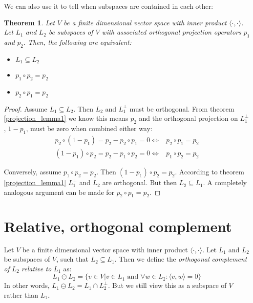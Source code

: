 \documentclass[12pt, a4paper]{article}
\newtheorem{theorem}{Theorem}[section]
\numberwithin{equation}{section}
\begin{document}
We can also use it to tell when subspaces are contained in each other:

\begin{theorem}
\label{projection_lemma2}
Let $V$ be a finite dimensional vector space with inner product $\langle\cdot,\cdot\rangle$. Let $L_1$ and $L_2$ be subspaces of $V$ with associated orthogonal projection operators $p_1$ and $p_2$. Then, the following are equivalent:
\begin{itemize}
\item $L_1\subseteq L_2$
\item $p_1\circ p_2=p_2$
\item $p_2\circ p_1=p_2$
\end{itemize}
\end{theorem}
\begin{proof}
Assume $L_1\subseteq L_2$. Then $L_2$ and $L_1^\perp$ must be orthogonal. From theorem \ref{projection_lemma1} we know this means $p_2$ and the orthogonal projection on $L_1^\perp$, $1-p_1$, must be zero when combined either way:
\begin{align}
p_2\circ(1-p_1)=p_2-p_2\circ p_1=0\Leftrightarrow& p_2\circ p_1=p_2 \\
(1-p_1)\circ p_2=p_2-p_1\circ p_2=0\Leftrightarrow& p_1\circ p_2=p_2
\end{align}

Conversely, assume $p_1\circ p_2=p_2$. Then $(1-p_1)\circ p_2=p_2$. According to theorem \ref{projection_lemma1} $L_1^\perp$ and $L_2$ are orthogonal. But then $L_2\subseteq L_1$. A completely analogous argument can be made for $p_2\circ p_1=p_2$.
\end{proof}

\section{Relative, orthogonal complement}
Let $V$ be a finite dimensional vector space with inner product $\langle\cdot,\cdot\rangle$. Let $L_1$ and $L_2$ be subspaces of $V$, such that $L_2\subseteq L_1$. Then we define the \textit{orthogonal complement of} $L_2$ \textit{relative to} $L_1$ as:
\begin{equation}
L_1\ominus L_2=\{v\in V|v\in L_1\textrm{ and }\forall w\in L_2: \langle v,w\rangle = 0\}
\end{equation}
In other words, $L_1\ominus L_2=L_1\cap L_2^\perp$. But we still view this as a subspace of $V$ rather than $L_1$.
\end{document}
